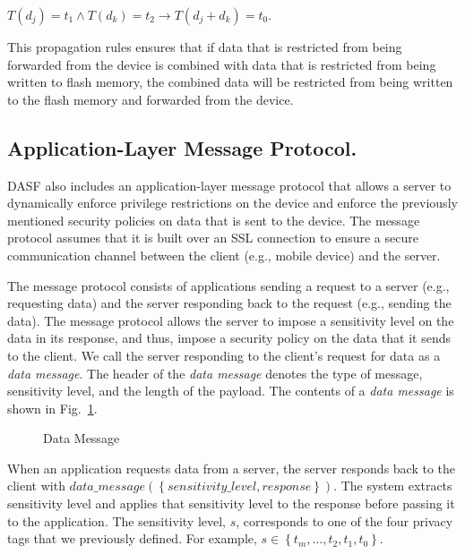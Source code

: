 $T\left(d_{j}\right) = t_1 \wedge T\left(d_{k}\right) = t_2 \to T\left(d_{j}+d_{k}\right) = t_0$.

This propagation rules ensures that if data that is restricted from
being forwarded from the device is combined with data that is restricted
from being written to flash memory, the combined data will be restricted
from being written to the flash memory and forwarded from the device.

\subsection{Application-Layer Message Protocol.}   
DASF also includes an application-layer message protocol
that allows a server to dynamically enforce privilege restrictions
on the device and enforce the previously mentioned security policies
on data that is sent to the device.  The message
protocol assumes that it is built over an SSL connection to ensure
a secure communication channel between the client (e.g., mobile
device) and the server.

The message protocol consists of applications sending a request to
a server (e.g., requesting data) and the server responding back
to the request (e.g., sending the data).  The message protocol
allows the server to impose a sensitivity level on the data in
its response, and thus, impose a security policy on the data that
it sends to the client.  We call the server responding to the
client's request for data as a \textit{data message}.
The header of the \textit{data message} denotes the type of message,
sensitivity level, and the length of the payload.  The contents of a
\textit{data message} is shown in Fig.~\ref{fig:datamessage}.

\begin{figure}[ht]
\centering
{}
\caption{Data Message}
\label{fig:datamessage}
\end{figure}


When an application requests data from a server, the server
responds back to the client with
$data\_message\left(\left\{sensitivity\_level, response\right\}\right)$.
The system extracts sensitivity level and applies that sensitivity level
to the response before passing it to the application.  The sensitivity
level, $s$, corresponds to one of the four privacy tags that we previously defined.
For example,  $s \in \left\{t_m,..., t_2, t_1, t_0\right\}$.

